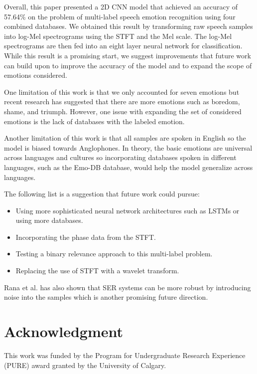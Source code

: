 \documentclass[conference]{IEEEtran}
\begin{document}
Overall, this paper presented a 2D CNN model that achieved an accuracy of 57.64\% on the problem of multi-label speech emotion recognition using four combined databases. We obtained this result by transforming raw speech samples into log-Mel spectrograms using the STFT and the Mel scale. The log-Mel spectrograms are then fed into an eight layer neural network for classification. While this result is a promising start, we suggest improvements that future work can build upon to improve the accuracy of the model and to expand the scope of emotions considered.

One limitation of this work is that we only accounted for seven emotions but recent research has suggested that there are more emotions such as boredom, shame, and triumph. \cite{Cordaro2018} However, one issue with expanding the set of considered emotions is the lack of databases with the labeled emotion.

Another limitation of this work is that all samples are spoken in English so the model is biased towards Anglophones. In theory, the basic emotions are universal across languages and cultures so incorporating databases spoken in different languages, such as the Emo-DB database, would help the model generalize across languages.\cite{Burkhardt2005}

The following list is a suggestion that future work could pursue:
\begin{itemize}
	\item Using more sophisticated neural network architectures such as LSTMs or using more databases.
	\item Incorporating the phase data from the STFT.
	\item Testing a binary relevance approach to this multi-label problem.
	\item Replacing the use of STFT with a wavelet transform.
\end{itemize}
Rana et al. \cite{Rana2016} has also shown that SER systems can be more robust by introducing noise into the samples which is another promising future direction.

\section*{Acknowledgment}
This work was funded by the Program for Undergraduate Research Experience (PURE) award granted by the University of Calgary.



\end{document}
